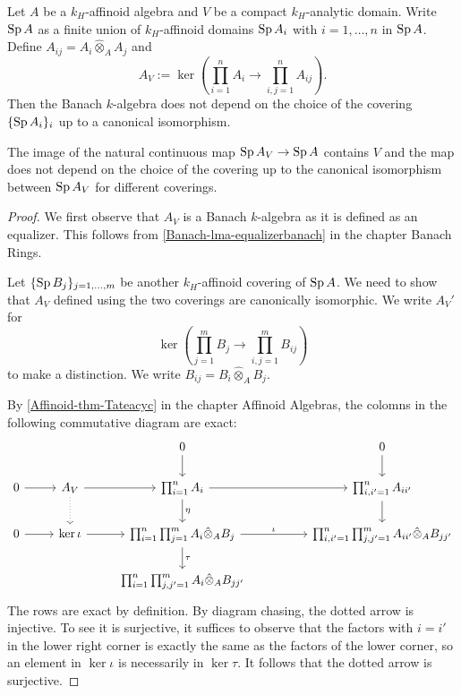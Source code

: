 \begin{lemma}\label{lma-compactanalyticdomainring}
    Let $A$ be a $k_H$-affinoid algebra and $V$ be a compact $k_H$-analytic domain. Write $\operatorname{Sp} A$ as a finite union of $k_H$-affinoid domains $\operatorname{Sp} A_i$ with $i=1,\ldots,n$ in $\operatorname{Sp} A$. Define $A_{ij}=A_i\hat{\otimes}_A A_j$ and 
    \[
        A_V:=\ker  \left( \prod_{i=1}^n A_i \rightarrow \prod_{i,j=1}^n A_{ij}\right).
    \]
    Then the Banach $k$-algebra does not depend on the choice of the covering $\{\operatorname{Sp} A_i\}_i$ up to a canonical isomorphism.

    The image of the natural continuous map $\operatorname{Sp} A_V\rightarrow \operatorname{Sp} A$ contains $V$ and the map does not depend on the choice of the covering up to the canonical isomorphism between $\operatorname{Sp} A_V$ for different coverings.
\end{lemma}
\begin{proof}
    We first observe that $A_V$ is a Banach $k$-algebra as it is defined as an equalizer. This follows from \cref{Banach-lma-equalizerbanach} in the chapter Banach Rings.

    Let $\{\operatorname{Sp} B_j\}_{j=1,\ldots,m}$ be another $k_H$-affinoid covering of $\operatorname{Sp} A$. We need to show that $A_V$ defined using the two coverings are canonically isomorphic. We write $A_V'$ for  
    \[
        \ker  \left( \prod_{j=1}^m B_j \rightarrow \prod_{i,j=1}^m B_{ij}\right)
    \]  
    to make a distinction.
    We write $B_{ij}=B_i\hat{\otimes}_A B_j$. 
    
    By \cref{Affinoid-thm-Tateacyc} in the chapter Affinoid Algebras, the colomns in the following commutative diagram are exact:
    \[
        \begin{tikzcd}
            &                                 & 0 \arrow[d]                                                                             &  & 0 \arrow[d]                                                       \\
0 \arrow[r] & A_V \arrow[r] \arrow[d, dotted] & \prod_{i=1}^n A_i \arrow[d,"\eta"] \arrow[rr]                                                  &  & {\prod_{i,i'=1}^n A_{ii'}} \arrow[d]                              \\
0 \arrow[r] & \ker \iota \arrow[r]            & \prod_{i=1}^n\prod_{j=1}^m A_i\hat{\otimes}_A B_j \arrow[d, "\tau"] \arrow[rr, "\iota"] &  & {\prod_{i,i'=1}^n\prod_{j,j'=1}^m A_{ii'}\hat{\otimes}_A B_{jj'}} \\
            &                                 & {\prod_{i=1}^n\prod_{j,j'=1}^m A_i\hat{\otimes}_A B_{jj'}}                              &  &                                                                  
\end{tikzcd}  
    \]
    The rows are exact by definition. By diagram chasing, the dotted arrow is injective. To see it is surjective, it suffices to observe that the factors with $i=i'$ in the lower right corner is exactly the same as the factors of the lower corner, so an element in $\ker \iota$ is necessarily in $\ker \tau$. It follows that the dotted arrow is surjective.


\end{proof}
